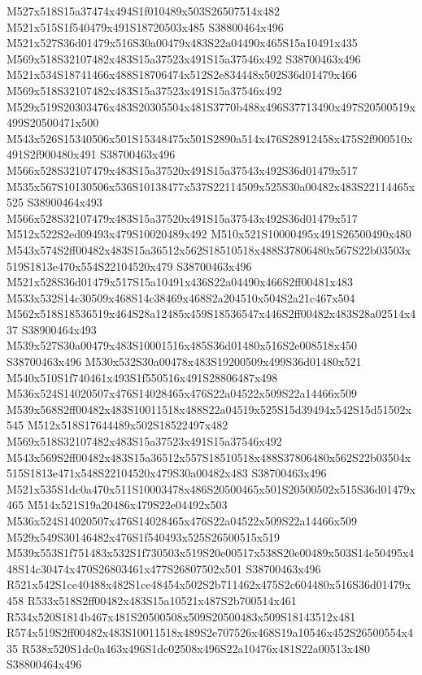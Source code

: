 \documentclass{article}
\begin{document}
\begin{multicols}{2}
M527x518S15a37474x494S1f010489x503S26507514x482 M521x515S1f540479x491S18720503x485 S38800464x496 M521x527S36d01479x516S30a00479x483S22a04490x465S15a10491x435 M569x518S32107482x483S15a37523x491S15a37546x492 S38700463x496 M521x534S18741466x488S18706474x512S2e834448x502S36d01479x466 M569x518S32107482x483S15a37523x491S15a37546x492 M529x519S20303476x483S20305504x481S3770b488x496S37713490x497S20500519x499S20500471x500 M543x526S15340506x501S15348475x501S2890a514x476S28912458x475S2f900510x491S2f900480x491 S38700463x496 M566x528S32107479x483S15a37520x491S15a37543x492S36d01479x517 M535x567S10130506x536S10138477x537S22114509x525S30a00482x483S22114465x525 S38900464x493 M566x528S32107479x483S15a37520x491S15a37543x492S36d01479x517 M512x522S2ed09493x479S10020489x492 M510x521S10000495x491S26500490x480 M543x574S2ff00482x483S15a36512x562S18510518x488S37806480x567S22b03503x519S1813e470x554S22104520x479 S38700463x496 M521x528S36d01479x517S15a10491x436S22a04490x466S2ff00481x483 M533x532S14c30509x468S14c38469x468S2a204510x504S2a21c467x504 M562x518S18536519x464S28a12485x459S18536547x446S2ff00482x483S28a02514x437 S38900464x493 M539x527S30a00479x483S10001516x485S36d01480x516S2e008518x450 S38700463x496 M530x532S30a00478x483S19200509x499S36d01480x521 M540x510S1f740461x493S1f550516x491S28806487x498 M536x524S14020507x476S14028465x476S22a04522x509S22a14466x509 M539x568S2ff00482x483S10011518x488S22a04519x525S15d39494x542S15d51502x545 M512x518S17644489x502S18522497x482 M569x518S32107482x483S15a37523x491S15a37546x492 M543x569S2ff00482x483S15a36512x557S18510518x488S37806480x562S22b03504x515S1813e471x548S22104520x479S30a00482x483 S38700463x496 M521x535S1dc0a470x511S10003478x486S20500465x501S20500502x515S36d01479x465 M514x521S19a20486x479S22e04492x503 M536x524S14020507x476S14028465x476S22a04522x509S22a14466x509 M529x549S30146482x476S1f540493x525S26500515x519 M539x553S1f751483x532S1f730503x519S20e00517x538S20e00489x503S14c50495x448S14c30474x470S26803461x477S26807502x501 S38700463x496 R521x542S1ce40488x482S1ce48454x502S2b711462x475S2c604480x516S36d01479x458 R533x518S2ff00482x483S15a10521x487S2b700514x461 R534x520S1814b467x481S20500508x509S20500483x509S18143512x481 R574x519S2ff00482x483S10011518x489S2e707526x468S19a10546x452S26500554x435 R538x520S1dc0a463x496S1dc02508x496S22a10476x481S22a00513x480 S38800464x496



\end{multicols}
\end{document}
